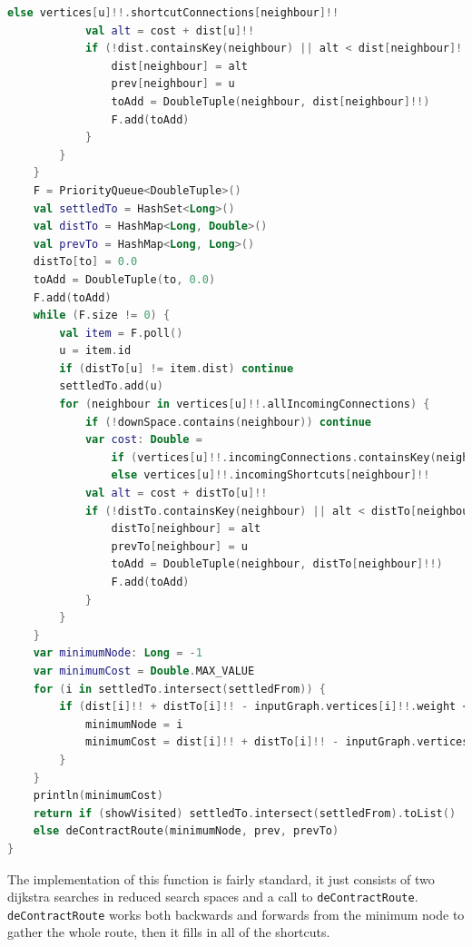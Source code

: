 \documentclass[11pt,twoside,a4paper]{article}
\begin{document}
\begin{lstlisting}[language=kotlin]
                else vertices[u]!!.shortcutConnections[neighbour]!!
            val alt = cost + dist[u]!!
            if (!dist.containsKey(neighbour) || alt < dist[neighbour]!!) {
                dist[neighbour] = alt
                prev[neighbour] = u
                toAdd = DoubleTuple(neighbour, dist[neighbour]!!)
                F.add(toAdd)
            }
        }
    }
    F = PriorityQueue<DoubleTuple>()
    val settledTo = HashSet<Long>()
    val distTo = HashMap<Long, Double>()
    val prevTo = HashMap<Long, Long>()
    distTo[to] = 0.0
    toAdd = DoubleTuple(to, 0.0)
    F.add(toAdd)
    while (F.size != 0) {
        val item = F.poll()
        u = item.id
        if (distTo[u] != item.dist) continue
        settledTo.add(u)
        for (neighbour in vertices[u]!!.allIncomingConnections) {
            if (!downSpace.contains(neighbour)) continue
            var cost: Double =
                if (vertices[u]!!.incomingConnections.containsKey(neighbour)) vertices[u]!!.incomingConnections[neighbour]!!
                else vertices[u]!!.incomingShortcuts[neighbour]!!
            val alt = cost + distTo[u]!!
            if (!distTo.containsKey(neighbour) || alt < distTo[neighbour]!!) {
                distTo[neighbour] = alt
                prevTo[neighbour] = u
                toAdd = DoubleTuple(neighbour, distTo[neighbour]!!)
                F.add(toAdd)
            }
        }
    }
    var minimumNode: Long = -1
    var minimumCost = Double.MAX_VALUE
    for (i in settledTo.intersect(settledFrom)) {
        if (dist[i]!! + distTo[i]!! - inputGraph.vertices[i]!!.weight < minimumCost) {
            minimumNode = i
            minimumCost = dist[i]!! + distTo[i]!! - inputGraph.vertices[i]!!.weight
        }
    }
    println(minimumCost)
    return if (showVisited) settledTo.intersect(settledFrom).toList()
    else deContractRoute(minimumNode, prev, prevTo)
}
\end{lstlisting}
The implementation of this function is fairly standard, it just consists of two dijkstra searches in reduced search spaces and a call to \texttt{deContractRoute}. \texttt{deContractRoute} works both backwards and forwards from the minimum node to gather the whole route, then it fills in all of the shortcuts.
\end{document}
